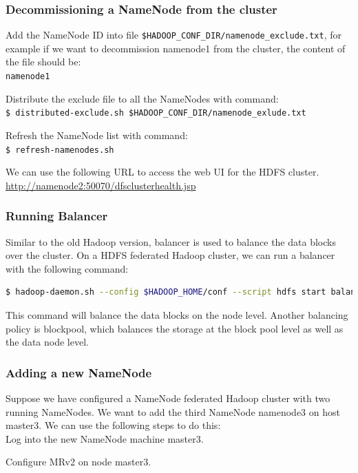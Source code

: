 \subsubsection*{Decommissioning a NameNode from the cluster}
Add the NameNode ID into file \verb|$HADOOP_CONF_DIR/namenode_exclude.txt|, for example if we want to decommission namenode1 from the cluster, the content of the file should be: \\
\verb|namenode1|

Distribute the exclude file to all the NameNodes with command: \\
\verb|$ distributed-exclude.sh $HADOOP_CONF_DIR/namenode_exlude.txt|

Refresh the NameNode list with command: \\
\verb|$ refresh-namenodes.sh|

We can use the following URL to access the web UI for the HDFS cluster.
\url{http://namenode2:50070/dfsclusterhealth.jsp}

\subsubsection*{Running Balancer}
Similar to the old Hadoop version, balancer is used to balance the data blocks over the cluster. On a HDFS federated Hadoop cluster, we can run a balancer with the following command: \\
\lstset{style=bashstyle}
\begin{lstlisting}[language=bash]
$ hadoop-daemon.sh --config $HADOOP_HOME/conf --script hdfs start balancer -policy node
\end{lstlisting}

This command will balance the data blocks on the node level. Another balancing policy is blockpool, which balances the storage at the block pool level as well as the data node level.

\subsubsection*{Adding a new NameNode}
Suppose we have configured a NameNode federated Hadoop cluster with two running NameNodes. We want to add the third NameNode namenode3 on host master3. We can use the following steps to do this: \\

Log into the new NameNode machine master3.

Configure MRv2 on node master3.

